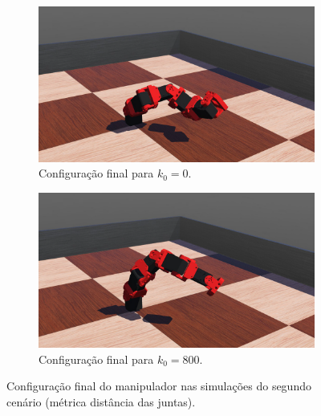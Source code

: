 \begin{figure}[ht]
    \centering
    \begin{subfigure}[b]{0.45\textwidth}
        \centering
        \includegraphics[width=\textwidth]{./Images/final-config-no-gain.png}
        \caption{Configuração final para \(k_0 = 0\).}
        \label{fig:subfig1}
    \end{subfigure}
    \hfill
    \begin{subfigure}[b]{0.45\textwidth}
        \centering
        \includegraphics[width=\textwidth]{./Images/final-config-max-gain.png}
        \caption{Configuração final para \(k_0 = 800\).}
        \label{fig:subfig2}
    \end{subfigure}
    \caption{Configuração final do manipulador nas simulações do segundo cenário (métrica distância das juntas).}
    \label{fig:final-configuration}
\end{figure}

